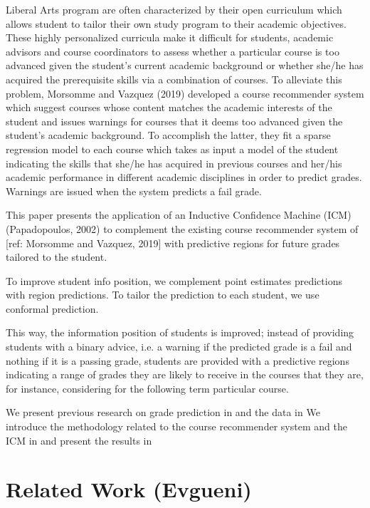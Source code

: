 \documentclass[pmlr]{jmlr}%
\begin{document}
Liberal Arts program are often characterized by their open curriculum which allows student to tailor their own study program to their academic objectives. These highly personalized curricula make it difficult for students, academic advisors and course coordinators to assess whether a particular course is too advanced given the student's current academic background or whether she/he has acquired the prerequisite skills via a combination of courses. To alleviate this problem, Morsomme and Vazquez (2019) developed a course recommender system which suggest courses whose content matches the academic interests of the student and issues warnings for courses that it deems too advanced given the student's academic background. To accomplish the latter, they fit a sparse regression model to each course which takes as input a model of the student indicating the skills that she/he has acquired in previous courses and her/his academic performance in different academic disciplines in order to predict grades. Warnings are issued when the system predicts a fail grade.



This paper presents the application of an Inductive Confidence Machine (ICM) (Papadopoulos, 2002) to complement the existing course recommender system of [ref: Morsomme and Vazquez, 2019] with predictive regions for future grades tailored to the student.


To improve student info position, we complement point estimates predictions with region predictions. To tailor the prediction to each student, we use conformal prediction.

This way, the information position of students is improved; instead of providing students with a binary advice, i.e. a warning if the predicted grade is a fail and nothing if it is a passing grade, students are provided with a predictive regions indicating a range of grades they are likely to receive in the courses that they are, for instance, considering for the following term particular course.

We present previous research on grade prediction in  and the data in 
We introduce the methodology related to the course recommender system and the ICM in  and present the results in 

\section{Related Work (Evgueni)}
\label{sec:related}
\end{document}
